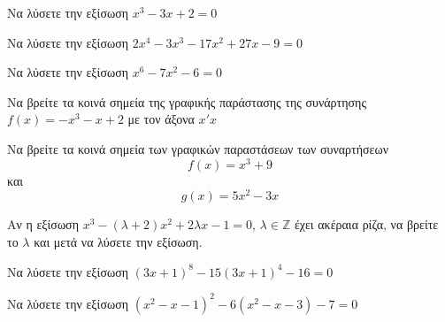 \documentclass[greek]{beamer}
\begin{document}
\begin{askisi}
  Να λύσετε την εξίσωση $x^3-3x+2=0$


\end{askisi}

\begin{askisi}
  Να λύσετε την εξίσωση $2x^4-3x^3-17x^2+27x-9=0$


\end{askisi}

\begin{askisi}
  Να λύσετε την εξίσωση $x^6-7x^2-6=0$


\end{askisi}

\begin{askisi}
  Να βρείτε τα κοινά σημεία της γραφικής παράστασης της συνάρτησης $f(x)=-x^3-x+2$ με τον άξονα $x'x$


\end{askisi}

\begin{askisi}
  Να βρείτε τα κοινά σημεία των γραφικών παραστάσεων των συναρτήσεων $$f(x)=x^3+9$$ και $$g(x)=5x^2-3x$$


\end{askisi}

\begin{askisi}
  Αν η εξίσωση $x^3-(λ+2)x^2+2λx-1=0$, $λ\in\mathbb{Z}$ έχει ακέραια ρίζα, να βρείτε το $λ$ και μετά να λύσετε την εξίσωση.


\end{askisi}

\begin{askisi}
  Να λύσετε την εξίσωση $(3x+1)^8-15(3x+1)^4-16=0$


\end{askisi}

\begin{askisi}
  Να λύσετε την εξίσωση $(x^2-x-1)^2-6(x^2-x-3)-7=0$


\end{askisi}
\end{document}
